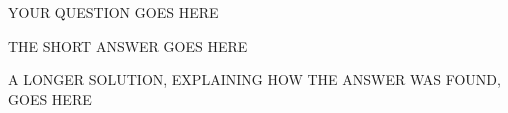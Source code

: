 \documentclass{ximera}
\author{YOUR NAME}
\begin{document}
\begin{exercise}\label{CHOOSE.A.NEW.LABEL}

YOUR QUESTION GOES HERE
  
\begin{solution}

\ans THE SHORT ANSWER GOES HERE

\soln A LONGER SOLUTION, EXPLAINING HOW THE ANSWER WAS FOUND, GOES HERE

\end{solution}
\end{exercise}
\end{document}
